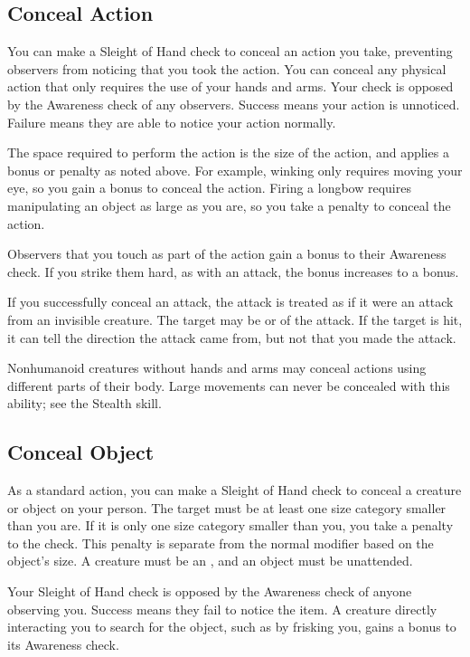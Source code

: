     \subsection{Conceal Action}
        You can make a Sleight of Hand check to conceal an action you take, preventing observers from noticing that you took the action. You can conceal any physical action that only requires the use of your hands and arms. Your check is opposed by the Awareness check of any observers. Success means your action is unnoticed. Failure means they are able to notice your action normally.

        The space required to perform the action is the size of the action, and applies a bonus or penalty as noted above. For example, winking only requires moving your eye, so you gain a  bonus to conceal the action. Firing a longbow requires manipulating an object as large as you are, so you take a  penalty to conceal the action.

        Observers that you touch as part of the action gain a  bonus to their Awareness check. If you strike them hard, as with an attack, the bonus increases to a  bonus.

        If you successfully conceal an attack, the attack is treated as if it were an attack from an invisible creature. The target may be \unaware or \partiallyunaware of the attack. If the target is hit, it can tell the direction the attack came from, but not that you made the attack.

        Nonhumanoid creatures without hands and arms may conceal actions using different parts of their body. Large movements can never be concealed with this ability; see the Stealth skill.

    \subsection{Conceal Object}
        As a standard action, you can make a Sleight of Hand check to conceal a creature or object on your person.
        The target must be at least one size category smaller than you are.
        If it is only one size category smaller than you, you take a  penalty to the check.
        This penalty is separate from the normal modifier based on the object's size.
        A creature must be an , and an object must be unattended.

        Your Sleight of Hand check is opposed by the Awareness check of anyone observing you.
        Success means they fail to notice the item. A creature directly interacting you to search for the object, such as by frisking you, gains a  bonus to its Awareness check.

